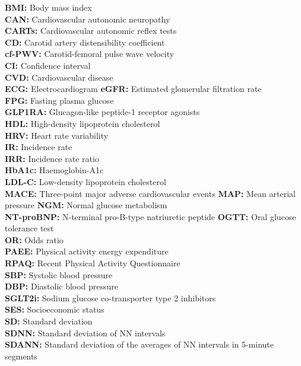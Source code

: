 \documentclass[
  letterpaper,
  headsepline=true,
  open=any]{scrbook}
\begin{document}
\textbf{BMI:} Body mass index\\
\textbf{CAN:} Cardiovascular autonomic neuropathy\\
\textbf{CARTs:} Cardiovascular autonomic reflex tests\\
\textbf{CD:} Carotid artery distensibility coefficient\\
\textbf{cf-PWV:} Carotid-femoral pulse wave velocity\\
\textbf{CI:} Confidence interval\\
\textbf{CVD:} Cardiovascular disease\\
\textbf{ECG:} Electrocardiogram \textbf{eGFR:} Estimated glomerular
filtration rate\\
\textbf{FPG:} Fasting plasma glucose\\
\textbf{GLP1RA:} Glucagon-like peptide-1 receptor agonists\\
\textbf{HDL:} High-density lipoprotein cholesterol\\
\textbf{HRV:} Heart rate variability\\
\textbf{IR:} Incidence rate\\
\textbf{IRR:} Incidence rate ratio\\
\textbf{HbA1c:} Haemoglobin-A1c\\
\textbf{LDL-C:} Low-density lipoprotein cholesterol\\
\textbf{MACE:} Three-point major adverse cardiovascular events
\textbf{MAP:} Mean arterial pressure \textbf{NGM:} Normal glucose
metabolism\\
\textbf{NT-proBNP:} N-terminal pro-B-type natriuretic peptide
\textbf{OGTT:} Oral glucose tolerance test\\
\textbf{OR:} Odds ratio\\
\textbf{PAEE:} Physical activity energy expenditure\\
\textbf{RPAQ:} Recent Physical Activity Questionnaire\\
\textbf{SBP:} Systolic blood pressure\\
\textbf{DBP:} Diastolic blood pressure\\
\textbf{SGLT2i:} Sodium glucose co-transporter type 2 inhibitors\\
\textbf{SES:} Socioeconomic status\\
\textbf{SD:} Standard deviation\\
\textbf{SDNN:} Standard deviation of NN intervals\\
\textbf{SDANN:} Standard deviation of the averages of NN intervals in
5-minute segments\\
\end{document}
